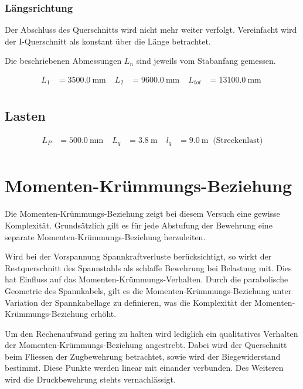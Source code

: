 \documentclass[
  11pt,
  letterpaper,
]{scrreprt}
\begin{document}
\subsubsection{Längsrichtung}\label{luxe4ngsrichtung}

Der Abschluss des Querschnitts wird nicht mehr weiter verfolgt.
Vereinfacht wird der I-Querschnitt als konstant über die Länge
betrachtet.

Die beschriebenen Abmessungen \(L_n\) sind jeweils vom Stabanfang
gemessen.

$$
\begin{aligned}
L_{1} &= 3500.0\ \mathrm{mm} \; 
 &L_{2} &= 9600.0\ \mathrm{mm} \; 
 &L_{tot} &= 13100.0\ \mathrm{mm} \; 
\\[12pt]
\end{aligned}
$$

\subsection{Lasten}\label{lasten}

$$
\begin{aligned}
L_{P} &= 500.0\ \mathrm{mm} \; 
 &L_{q} &= 3.8\ \mathrm{m} \; 
 &l_{q} &= 9.0\ \mathrm{m} \; \;\textrm{(Streckenlast)}
\\[12pt]
\end{aligned}
$$

\section{Momenten-Krümmungs-Beziehung}\label{momenten-kruxfcmmungs-beziehung}

Die Momenten-Krümmungs-Beziehung zeigt bei diesem Versuch eine gewisse
Komplexität. Grundsätzlich gilt es für jede Abstufung der Bewehrung eine
separate Momenten-Krümmungs-Beziehung herzuleiten.

Wird bei der Vorspannung Spannkraftverluste berücksichtigt, so wirkt der
Restquerschnitt des Spannstahls als schlaffe Bewehrung bei Belastung
mit. Dies hat Einfluss auf das Momenten-Krümmungs-Verhalten. Durch die
parabolische Geometrie des Spannkabels, gilt es die
Momenten-Krümmungs-Beziehung unter Variation der Spannkabellage zu
definieren, was die Komplexität der Momenten-Krümmungs-Beziehung erhöht.

Um den Rechenaufwand gering zu halten wird lediglich ein qualitatives
Verhalten der Momenten-Krümmungs-Beziehung angestrebt. Dabei wird der
Querschnitt beim Fliessen der Zugbewehrung betrachtet, sowie wird der
Biegewiderstand bestimmt. Diese Punkte werden linear mit einander
verbunden. Des Weiteren wird die Druckbewehrung stehts vernachlässigt.
\end{document}
